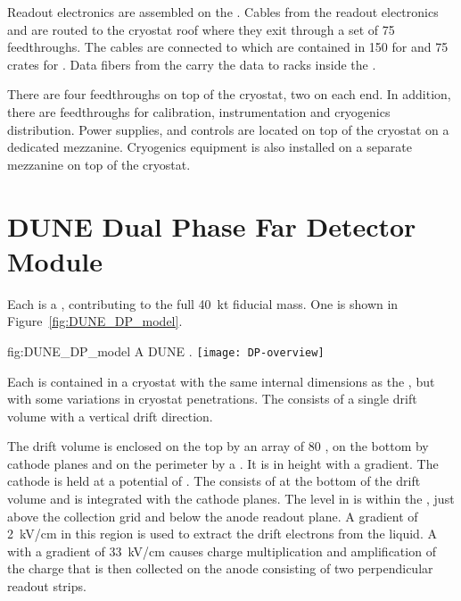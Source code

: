 Readout electronics are assembled on the . Cables from the
readout electronics and  are routed to the cryostat roof
where they exit through a set of \num{75} feedthroughs. The cables are
connected to  which are contained in \num{150}
 for  and \num{75} crates for . Data
fibers from the  carry the data to  racks
inside the .

There are four  feedthroughs on top of the cryostat, two on
each end. In addition, there are feedthroughs for calibration,
instrumentation and cryogenics distribution. Power supplies, and
controls are located on top of the cryostat on a dedicated
mezzanine. Cryogenics equipment is also installed on a separate
mezzanine on top of the cryostat.

\section{DUNE Dual Phase Far Detector Module}
\label{sec:fdsp-DP-module}

Each  is a \nominalmodsize {}, contributing
to the full \SI{40}{\kilo\tonne}  fiducial mass.  One
\nominalmodsize {} is shown in
Figure~\ref{fig:DUNE_DP_model}.
\begin{dunefigure}{fig:DUNE_DP_model} {A \nominalmodsize DUNE   .}
  \texttt{[image: DP-overview]}
\end{dunefigure} 

Each  is contained in a cryostat with the same internal
dimensions as the , but with some variations in cryostat
penetrations.  The  consists of a single drift volume
with a vertical drift direction.

The drift volume is enclosed on the top by an array of \num{80}
, on the bottom by cathode planes and on the perimeter by
a . It is \dpmaxdrift in height with a \dpnominaldriftfield
gradient. The cathode is held at a potential of
\dptargetdriftvoltneg{}.  The   consists of
\dpnumpmtch {} at the bottom of the drift volume and is
integrated with the cathode planes.  The  level in
 is within the , just above the collection
grid and below the anode readout plane. A gradient of
\SI{2}{\kilo\volt/\centi\meter} in this region is used to extract the
drift electrons from the liquid. A  with a gradient of
\SI{33}{\kilo\volt/\centi\meter} causes charge multiplication and
amplification of the charge that is then collected on the anode
consisting of two perpendicular %
readout strips.

